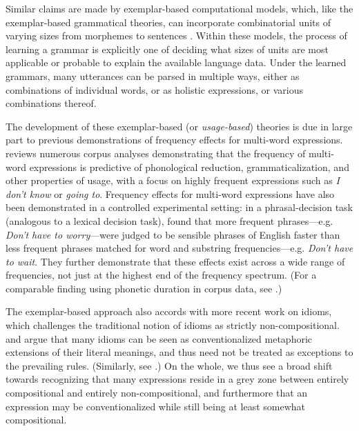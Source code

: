 \documentclass[authoryear]{elsarticle}
\begin{document}
Similar claims are made by exemplar-based computational models, which, like the exemplar-based grammatical theories, can incorporate combinatorial units of varying sizes from morphemes to sentences \citep[e.g.][]{Bod:1998tx,Bod:2003uw, Bod:2008uc, Pierrehumbert:2000wh, Johnson:2007wl, ODonnell:2011vh, Post:2013hh}. Within these models, the process of learning a grammar is explicitly one of deciding what sizes of units are most applicable or probable to explain the available language data. Under the learned grammars, many utterances can be parsed in multiple ways, either as combinations of individual words, or as holistic expressions, or various combinations thereof.

The development of these exemplar-based (or \emph{usage-based}) theories is due in large part to previous demonstrations of frequency effects for multi-word expressions. \citet{Bybee:2006ul} reviews numerous corpus analyses demonstrating that the frequency of multi-word expressions is predictive of phonological reduction, grammaticalization, and other properties of usage, with a focus on highly frequent expressions such as \emph{I don't know} or \emph{going to}. Frequency effects for multi-word expressions have also been demonstrated in a controlled experimental setting: in a phrasal-decision task (analogous to a lexical decision task), \citet{Arnon:2010hz} found that more frequent phrases---e.g. \emph{Don't have to worry}---were judged to be sensible phrases of English faster than less frequent phrases matched for word and substring frequencies---e.g. \emph{Don't have to wait}. They further demonstrate that these effects exist across a wide range of frequencies, not just at the highest end of the frequency spectrum. (For a comparable finding using phonetic duration in corpus data, see \citealp{Arnon:2013tr}.)
	
The exemplar-based approach also accords with more recent work on idioms, which challenges the traditional notion of idioms as strictly non-compositional. \citet{Gibbs:1990wh} and \citet{Nunberg:1994uc} argue that many idioms can be seen as conventionalized metaphoric extensions of their literal meanings, and thus need not be treated as exceptions to the prevailing rules. (Similarly, see \citealp{Holsinger:2013iv}.) On the whole, we thus see a broad shift towards recognizing that many expressions reside in a grey zone between entirely compositional and entirely non-compositional, and furthermore that an expression may be conventionalized while still being at least somewhat compositional.
\end{document}
